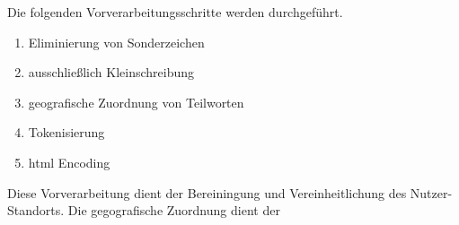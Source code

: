 Die folgenden Vorverarbeitungsschritte werden durchgeführt.

	\begin{enumerate}
		\item Eliminierung von Sonderzeichen
		\item ausschließlich Kleinschreibung
		\item geografische Zuordnung von Teilworten  	
		\item Tokenisierung
		\item html Encoding
	\end{enumerate}

	Diese Vorverarbeitung dient der Bereiningung und Vereinheitlichung des Nutzer-Standorts.  
	Die gegografische Zuordnung dient der  

